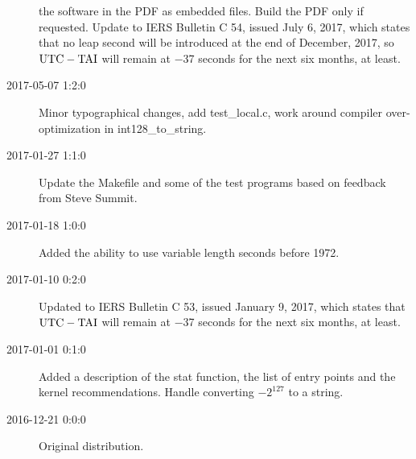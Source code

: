 \documentclass[letterpaper,twoside]{article}
\begin{document}
\begin{description}
  the software in the PDF as embedded files.  Build the PDF
  only if requested.  Update to IERS Bulletin C 54, issued
  July 6, 2017, which states that no leap second will be introduced
  at the end of December, 2017, so $\rm{UTC}-\rm{TAI}$ will remain at
  \num{-37} seconds for the next six months, at least.
\item[2017-05-07 1:2:0] Minor typographical changes, add test\_local.c,
  work around compiler over-optimization in int128\_to\_string.
\item[2017-01-27 1:1:0] Update the Makefile and some of the test programs
  based on feedback from Steve Summit.
\item[2017-01-18 1:0:0] Added the ability to use variable length seconds
  before 1972.
\item[2017-01-10 0:2:0] Updated to IERS Bulletin C 53,
  issued January 9, 2017, which states that $\rm{UTC}-\rm{TAI}$
  will remain at \num{-37} seconds for the next six months, at least.
\item[2017-01-01 0:1:0] Added a description of the stat function,
  the list of entry points and the kernel recommendations.
  Handle converting $-2^{127}$ to a string. 
\item[2016-12-21 0:0:0] Original distribution.
\end{description}


\end{document}
